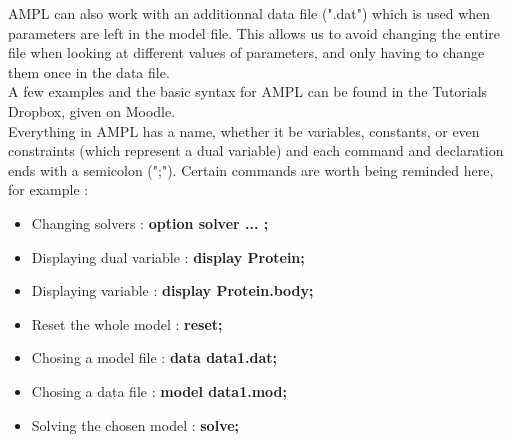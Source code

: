 AMPL can also work with an additionnal data file (".dat") which is used when parameters are left in the model file. This allows us to avoid changing the entire file when looking at different values of parameters, and only having to change them once in the data file. \\

A few examples and the basic syntax for AMPL can be found in the Tutorials Dropbox, given on Moodle. \\

Everything in AMPL has a name, whether it be variables, constants, or even constraints (which represent a dual variable) and each command and declaration ends with a semicolon (";"). 
Certain commands are worth being reminded here, for example : \\

\begin{itemize}
  \item Changing solvers : \textbf{option solver ... ;}
  \item Displaying dual variable : \textbf{display Protein;}
  \item Displaying variable : \textbf{display Protein.body;}
  \item Reset the whole model : \textbf{reset;}
  \item Chosing a model file : \textbf{data data1.dat;}
  \item Chosing a data file : \textbf{model data1.mod;}
  \item Solving the chosen model : \textbf{solve;}
\end{itemize} 



